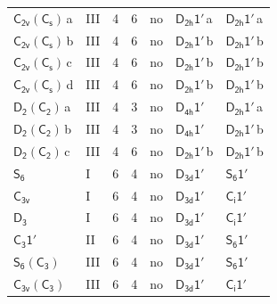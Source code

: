 \documentclass[10pt,a4paper]{article}
\numberwithin{equation}{section}
\newcommand{\grp}[1]{\mathsf{#1}}
\newcommand{\clsletter}[1]{\,{\scriptsize\color{black!55}#1}}
\begin{document}
{\begin{longtable}{@{}llrrlll@{}}
\href{C2v-C1v.pdf}{$\grp{C_{2v}}(\grp{C_{s}})$}\clsletter{a} & III & 4 & 6 & no & \href{D2h-1p.pdf}{$\grp{D_{2h}1'}$}\clsletter{a} & \href{D2h-1p.pdf}{$\grp{D_{2h}1'}$}\clsletter{a}\\
\href{C2v-C1v.pdf}{$\grp{C_{2v}}(\grp{C_{s}})$}\clsletter{b} & III & 4 & 6 & no & \href{D2h-1p.pdf}{$\grp{D_{2h}1'}$}\clsletter{b} & \href{D2h-1p.pdf}{$\grp{D_{2h}1'}$}\clsletter{b}\\
\href{C2v-C1v.pdf}{$\grp{C_{2v}}(\grp{C_{s}})$}\clsletter{c} & III & 4 & 6 & no & \href{D2h-1p.pdf}{$\grp{D_{2h}1'}$}\clsletter{b} & \href{D2h-1p.pdf}{$\grp{D_{2h}1'}$}\clsletter{b}\\
\href{C2v-C1v.pdf}{$\grp{C_{2v}}(\grp{C_{s}})$}\clsletter{d} & III & 4 & 6 & no & \href{D2h-1p.pdf}{$\grp{D_{2h}1'}$}\clsletter{b} & \href{D2h-1p.pdf}{$\grp{D_{2h}1'}$}\clsletter{b}\\
\href{D2-C2.pdf}{$\grp{D_{2}}(\grp{C_{2}})$}\clsletter{a} & III & 4 & 3 & no & \href{D4h-1p.pdf}{$\grp{D_{4h}1'}$} & \href{D2h-1p.pdf}{$\grp{D_{2h}1'}$}\clsletter{a}\\
\href{D2-C2.pdf}{$\grp{D_{2}}(\grp{C_{2}})$}\clsletter{b} & III & 4 & 3 & no & \href{D4h-1p.pdf}{$\grp{D_{4h}1'}$} & \href{D2h-1p.pdf}{$\grp{D_{2h}1'}$}\clsletter{b}\\
\href{D2-C2.pdf}{$\grp{D_{2}}(\grp{C_{2}})$}\clsletter{c} & III & 4 & 6 & no & \href{D2h-1p.pdf}{$\grp{D_{2h}1'}$}\clsletter{b} & \href{D2h-1p.pdf}{$\grp{D_{2h}1'}$}\clsletter{b}\\
\href{../../../rotation/data/pdf/S6.pdf}{$\grp{S_{6}}$} & I & 6 & 4 & no & \href{D3d-1p.pdf}{$\grp{D_{3d}1'}$} & \href{S6-1p.pdf}{$\grp{S_{6}1'}$}\\
\href{../../../rotation/data/pdf/C3v.pdf}{$\grp{C_{3v}}$} & I & 6 & 4 & no & \href{D3d-1p.pdf}{$\grp{D_{3d}1'}$} & \href{S2-1p.pdf}{$\grp{C_{i}1'}$}\\
\href{../../../rotation/data/pdf/D3.pdf}{$\grp{D_{3}}$} & I & 6 & 4 & no & \href{D3d-1p.pdf}{$\grp{D_{3d}1'}$} & \href{S2-1p.pdf}{$\grp{C_{i}1'}$}\\
\href{C3-1p.pdf}{$\grp{C_{3}1'}$} & II & 6 & 4 & no & \href{D3d-1p.pdf}{$\grp{D_{3d}1'}$} & \href{S6-1p.pdf}{$\grp{S_{6}1'}$}\\
\href{S6-C3.pdf}{$\grp{S_{6}}(\grp{C_{3}})$} & III & 6 & 4 & no & \href{D3d-1p.pdf}{$\grp{D_{3d}1'}$} & \href{S6-1p.pdf}{$\grp{S_{6}1'}$}\\
\href{C3v-C3.pdf}{$\grp{C_{3v}}(\grp{C_{3}})$} & III & 6 & 4 & no & \href{D3d-1p.pdf}{$\grp{D_{3d}1'}$} & \href{S2-1p.pdf}{$\grp{C_{i}1'}$}\\

\end{longtable}}
\end{document}
